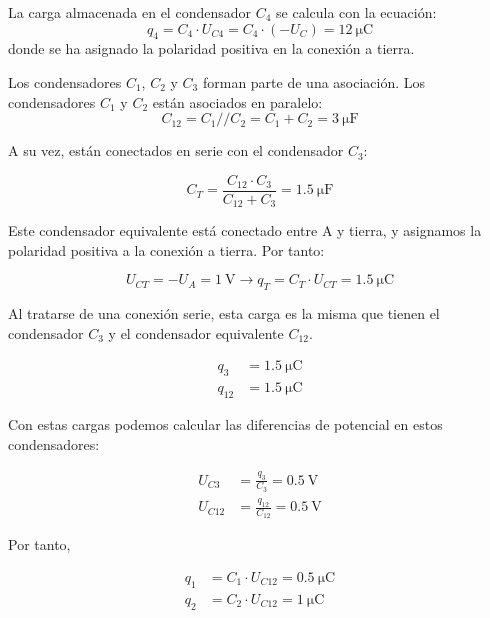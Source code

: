 La carga almacenada en el condensador $C_4$ se calcula con la ecuación:
\begin{equation*}
  q_4 = C_4 \cdot U_{C4} = C_4 \cdot (-U_C) = \qty{12}{\micro\coulomb}
\end{equation*}
donde se ha asignado la polaridad positiva en la conexión a tierra.

Los condensadores $C_1$, $C_2$ y $C_3$ forman parte de una asociación. Los condensadores $C_1$ y $C_2$ están asociados en paralelo:
\begin{equation*}
  C_{12} = C_1//C_2 = C_1 + C_2 = \qty{3}{\micro\farad}
\end{equation*}

A su vez, están conectados en serie con el condensador $C_3$:

\begin{equation*}
  C_T = \frac{C_{12} \cdot C_3}{C_{12} + C_3} = \qty{1.5}{\micro\farad}
\end{equation*}

Este condensador equivalente está conectado entre A y tierra, y asignamos la polaridad positiva a la conexión a tierra. Por tanto:

\begin{equation*}
  U_{CT} = -U_A = \qty{1}{\volt} \rightarrow q_T = C_T \cdot U_{CT} = \qty{1.5}{\micro\coulomb}
\end{equation*}

Al tratarse de una conexión serie, esta carga es la misma que tienen el condensador $C_3$ y el condensador equivalente $C_{12}$.

\begin{align*}
  q_3 &=  \qty{1.5}{\micro\coulomb}\\
  q_{12} &=  \qty{1.5}{\micro\coulomb}
\end{align*}

Con estas cargas podemos calcular las diferencias de potencial en estos condensadores:

\begin{align*}
  U_{C3} &=  \frac{q_3}{C_3} = \qty{0.5}{\volt}\\
  U_{C12} &=  \frac{q_{12}}{C_{12}} = \qty{0.5}{\volt}
\end{align*}

Por tanto,

\begin{align*}
  q_1 &= C_1 \cdot U_{C12} = \qty{0.5}{\micro\coulomb}\\
  q_2 &= C_2 \cdot U_{C12} = \qty{1}{\micro\coulomb}
\end{align*}

